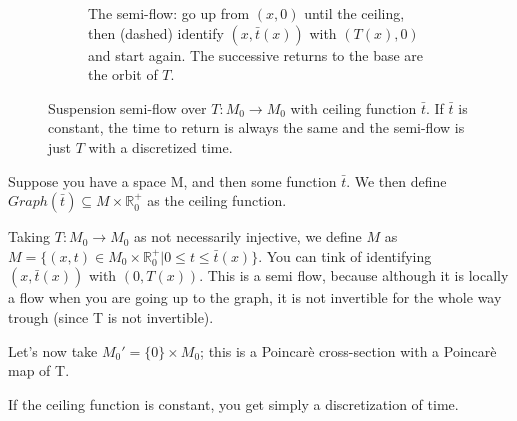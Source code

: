 \begin{example}
\begin{figure}[ht]
\begin{subfigure}[t]{\textwidth}
        \caption{The semi-flow: go up from $(x,0)$ until the ceiling, then (dashed) identify
        $(x,\bar{t}(x))$ with $(T(x),0)$ and start again. The successive returns to the base are the orbit of $T$.}
        \label{fig:suspension_b}
    \end{subfigure}

    \caption{Suspension semi-flow over $T:M_0\to M_0$ with ceiling function $\bar{t}$.
    If $\bar{t}$ is constant, the time to return is always the same and the semi-flow is just
    $T$ with a discretized time.}
    \label{fig:suspension}
\end{figure}

    Suppose you have a space M, and then some function $\bar{t}$. We then define $Graph(\bar{t})\subseteq M\times\mathbb{R}_0^+$ as the ceiling function. 
    
    Taking $T:M_0\rightarrow M_0$ as not necessarily injective, we define $M$ as $M=\{(x,t)\in M_0\times \mathbb{R}_0^+|0\leq t\leq \bar{t}(x)\}$. You can tink of identifying $(x, \bar{t}(x))$ with $(0, T(x))$. This is a semi flow, because although it is locally a flow when you are going up to the graph, it is not invertible for the whole way trough (since T is not invertible). 

    Let's now take $M_0'=\{0\}\times M_0$; this is a Poincarè cross-section with a Poincarè map of T. 
    
    If the ceiling function is constant, you get simply a discretization of time.  
\end{example}

